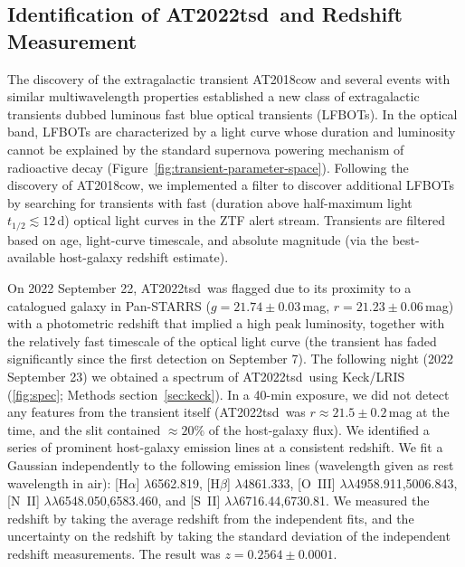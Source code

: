 \documentclass{nature_plusfigure}
\newcommand{\at}{AT2022tsd}
\begin{document}
\clearpage
\newpage

\begin{methods}

\section{Identification of \at\ and Redshift Measurement}
\label{sec:discovery}

The discovery of the extragalactic transient AT2018cow\cite{Prentice2018} and several events with similar multiwavelength properties\cite{Coppejans2020,Ho2020_Koala,Yao2022,Perley2021} established a new class of extragalactic transients dubbed luminous fast blue optical transients (LFBOTs\cite{Metzger2022}).
In the optical band, LFBOTs are characterized by a light curve whose duration and luminosity cannot be explained by the standard supernova powering mechanism of radioactive decay (Figure~\ref{fig:transient-parameter-space}).
Following the discovery of AT2018cow, we implemented a filter to discover additional LFBOTs by searching for transients with fast (duration above half-maximum light $t_{1/2}\lesssim12\,$d\cite{Drout2014}) optical light curves in the ZTF alert stream\cite{Ho2022_RET}.
Transients are filtered based on age, light-curve timescale, and absolute magnitude (via the best-available host-galaxy redshift estimate).

On 2022 September 22, \at\ was flagged due to its proximity to a catalogued galaxy in Pan-STARRS ($g=21.74\pm0.03$\,mag, $r=21.23\pm0.06$\,mag) with a photometric redshift that implied a high peak luminosity, together with the relatively fast timescale of the optical light curve (the transient has faded significantly since the first detection on September 7).
The following night (2022 September 23) we obtained a spectrum of \at\ using Keck/LRIS (\ref{fig:spec}; Methods section~\ref{sec:keck}).
In a 40-min exposure, we did not detect any features from the transient itself (\at\ was $r\approx21.5\pm0.2$\,mag at the time, and the slit contained $\approx20\%$ of the host-galaxy flux). We identified a series of prominent host-galaxy emission lines at a consistent redshift. We fit a Gaussian independently to the following emission lines (wavelength given as rest wavelength in air): [H$\alpha$] $\lambda$6562.819, [H$\beta$] $\lambda$4861.333, 
 [O~III] $\lambda$$\lambda$4958.911,5006.843, 
  [N~II] $\lambda$$\lambda$6548.050,6583.460, and [S~II] $\lambda\lambda$6716.44,6730.81. 
We measured the redshift by taking the average redshift from the independent fits, and the uncertainty on the redshift by taking the standard deviation of the independent redshift measurements.
The result was $z=0.2564\pm0.0001$.


\end{methods}
\end{document}
